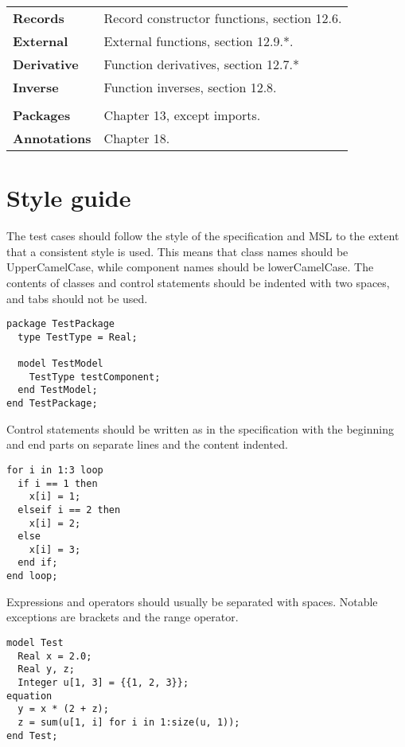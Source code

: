 \documentclass{article}
\begin{document}
\begin{tabular}{l l}
    \indent\textbf{Records}          & Record constructor functions, section 12.6. \\
    \indent\textbf{External}         & External functions, section 12.9.*. \\
    \indent\textbf{Derivative}       & Function derivatives, section 12.7.* \\
    \indent\textbf{Inverse}          & Function inverses, section 12.8. \\
  \\
  \textbf{Packages}                  & Chapter 13, except imports. \\
  \textbf{Annotations}               & Chapter 18. \\

\end{tabular}
\newpage
\section{Style guide}
The test cases should follow the style of the specification and MSL to the
extent that a consistent style is used. This means that class names should be
UpperCamelCase, while component names should be lowerCamelCase.  The contents of
classes and control statements should be indented with two spaces, and tabs
should not be used.
\begin{lstlisting}[language=modelica]
package TestPackage
  type TestType = Real;

  model TestModel
    TestType testComponent;
  end TestModel;
end TestPackage;
\end{lstlisting}
Control statements should be written as in the specification with the beginning
and end parts on separate lines and the content indented.
\begin{lstlisting}[language=modelica]
for i in 1:3 loop
  if i == 1 then
    x[i] = 1;
  elseif i == 2 then
    x[i] = 2;
  else
    x[i] = 3;
  end if;
end loop;
\end{lstlisting}
Expressions and operators should usually be separated with spaces. Notable
exceptions are brackets and the range operator.
\begin{lstlisting}[language=modelica]
model Test
  Real x = 2.0;
  Real y, z;
  Integer u[1, 3] = {{1, 2, 3}};
equation
  y = x * (2 + z);
  z = sum(u[1, i] for i in 1:size(u, 1));
end Test;
\end{lstlisting}
\end{document}
